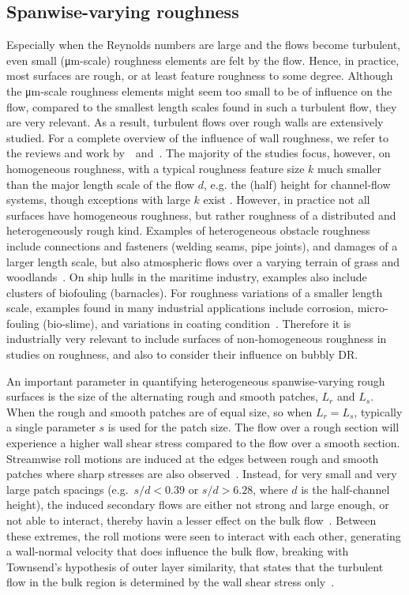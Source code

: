 \documentclass[aps,twocolumn,10pt,floatfix, superscriptaddress,longbibliography,pra]{revtex4-1}
\begin{document}
\subsection{Spanwise-varying roughness}
Especially when the Reynolds numbers are large and the flows become turbulent, even small (\si{\micro \meter}-scale) roughness elements are felt by the flow. Hence, in practice, most surfaces are rough, or at least feature roughness to some degree. Although the \si{\micro \meter}-scale roughness elements might seem too small to be of influence on the flow, compared to the smallest length scales found in such a turbulent flow, they are very relevant. As a result, turbulent flows over rough walls are extensively studied. For a complete overview of the influence of wall roughness, we refer to the reviews and work by~\cite{Jimenez2004}~and~\cite{Flack2010, Flack2014}. The majority of the studies focus, however, on homogeneous roughness, with a typical roughness feature size $k$ much smaller than the major length scale of the flow $d$, e.g. the (half) height for channel-flow systems, though exceptions with large $k$ exist \citep{amir2014,mazzuoli2017}. However, in practice not all surfaces have homogeneous roughness, but rather roughness of a distributed and heterogeneously rough kind. Examples of heterogeneous obstacle roughness include connections and fasteners (welding seams, pipe joints), and damages of a larger length scale, but also atmospheric flows over a varying terrain of grass and woodlands~\citep{Ren2011}. On ship hulls in the maritime industry, examples also include clusters of biofouling (barnacles). For roughness variations of a smaller length scale, examples found in many industrial applications include corrosion, micro-fouling (bio-slime), and variations in coating condition~\citep{Yeginbayeva2018}. Therefore it is industrially very relevant to include surfaces of non-homogeneous roughness in studies on roughness, and also to consider their influence on bubbly DR.

An important parameter in quantifying heterogeneous spanwise-varying rough surfaces is the size of the alternating rough and smooth patches, $L_r$ and $L_s$. When the rough and smooth patches are of equal size, so when $L_r = L_s$, typically a single parameter $s$ is used for the patch size. The flow over a rough section will experience a higher wall shear stress compared to the flow over a smooth section. Streamwise roll motions are induced at the edges between rough and smooth patches where sharp stresses are also observed~\citep{Hinze1967,Barros2014,Willingham2014,Chung2018}.
Instead, for very small and very large patch spacings (e.g.~$s/d <0.39$ or $s/d > 6.28$, where $d$ is the half-channel height), the induced secondary flows are either not strong and large enough, or not able to interact, thereby havin a lesser  effect on the bulk flow~\citep{Chung2018}. Between these extremes, the roll motions were seen to interact with each other, generating a wall-normal velocity that does influence the bulk flow, breaking with Townsend's hypothesis \citep{Townsend1976} of outer layer similarity, that states that the turbulent flow in the bulk region is determined by the wall shear stress only~\citep{Chung2018}.
\end{document}
